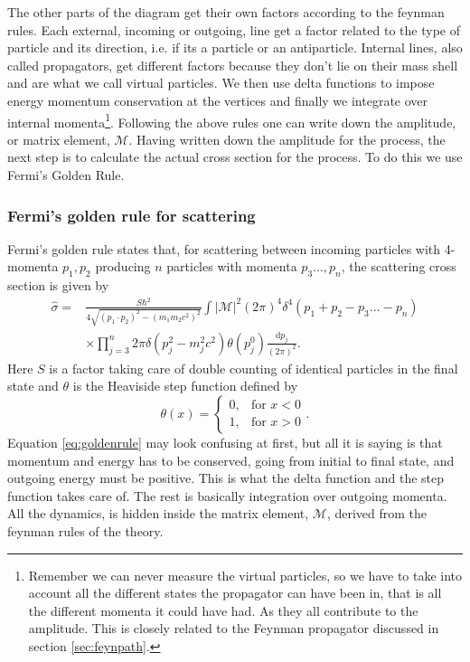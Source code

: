 The other parts of the diagram get their own factors according to the feynman rules. Each external, incoming or outgoing, line get a factor related to the type of particle and its direction, i.e. if its a particle or an antiparticle. Internal lines, also called propagators, get different factors because they don't lie on their mass shell and are what we call virtual particles. We then use delta functions to impose energy momentum conservation at the vertices and finally we integrate over internal momenta\footnote{Remember we can never measure the virtual particles, so we have to take into account all the different states the propagator can have been in, that is all the different momenta it could have had. As they all contribute to the amplitude. This is closely related to the Feynman propagator discussed in section \ref{sec:feynpath}.}. Following the above rules one can write down the amplitude, or matrix element, $\mathcal{M}$. Having written down the amplitude for the process, the next step is to calculate the actual cross section for the process. To do this we use Fermi's Golden Rule.
% 
\subsubsection{Fermi's golden rule for scattering}
Fermi's golden rule states that, for scattering between incoming particles with 4-momenta $p_1, p_2$ producing $n$ particles with momenta $p_3 \dots , p_n$, the scattering cross section is given by \cite{griffiths1987iep}
\begin{align} \label{eq:goldenrule}
	\hat \sigma = &\frac{S\hbar^2}{4\sqrt{(p_1 \cdot p_2)^2 - (m_1 m_2 c^2)^2}} \int |\mathcal{M}|^2 (2 \pi)^4 \delta^4(p_1+p_2-p_3 \dots -p_n) \nonumber \\
	&\times \prod_{j=3}^n 2\pi \delta(p_j^2 - m_j^2c^2)\theta(p_j^0) \frac{\textrm{d}p_j}{(2\pi)^2}.
\end{align}
Here $S$ is a factor taking care of double counting of identical particles in the final state and $\theta$ is the Heaviside step function defined by
\begin{equation}
	 \theta(x) = 
	\begin{cases} 
	  0,  & \mbox{for }x < 0 \\
	  1,  & \mbox{for }x > 0 
	\end{cases}.
\end{equation}
Equation \eqref{eq:goldenrule} may look confusing at first, but all it is saying is that momentum and energy has to be conserved, going from initial to final state, and outgoing energy must be positive. This is what the delta function and the step function takes care of. The rest is basically integration over outgoing momenta. All the dynamics, is hidden inside the matrix element, $\mathcal{M}$, derived from the feynman rules of the theory.

